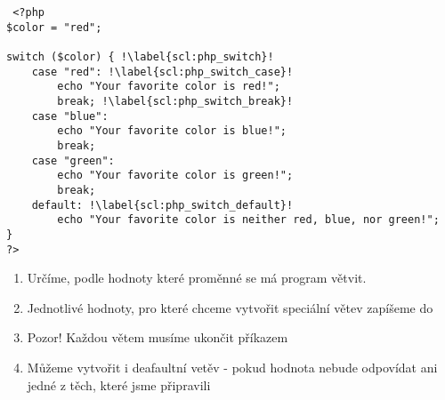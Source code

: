 \begin{minipage}[t]{.45\textwidth}
\begin{code}
\begin{verbatim}
 <?php
$color = "red";

switch ($color) { !\label{scl:php_switch}!
    case "red": !\label{scl:php_switch_case}!
        echo "Your favorite color is red!";
        break; !\label{scl:php_switch_break}!
    case "blue":
        echo "Your favorite color is blue!";
        break;
    case "green":
        echo "Your favorite color is green!";
        break;
    default: !\label{scl:php_switch_default}!
        echo "Your favorite color is neither red, blue, nor green!";
}
?> 
\end{verbatim}

\label{code:php_switch}
\end{code}
\end{minipage}
\begin{minipage}[t]{.45\textwidth}
\begin{enumerate}
\item[ř. \ref{scl:php_switch}:] Určíme, podle hodnoty které proměnné se má program větvit.
\item[ř. \ref{scl:php_switch_case}:] Jednotlivé hodnoty, pro které chceme vytvořit speciální větev zapíšeme do 
\item[ř. \ref{scl:php_switch_break}:] Pozor! Každou větem musíme ukončit příkazem 
\vspace{3cm}
\item[ř. \ref{scl:php_switch_default}:] Můžeme vytvořit i deafaultní vetěv - pokud hodnota nebude odpovídat ani jedné z těch, které jsme připravili
\end{enumerate}
\end{minipage}\\

